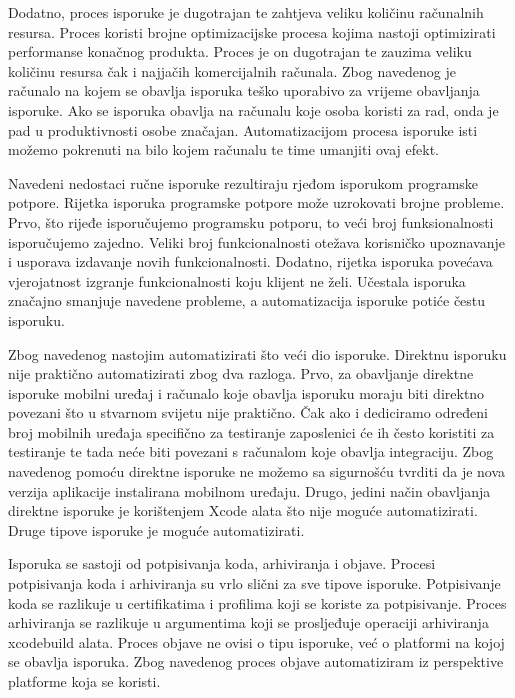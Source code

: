\documentclass[times, utf8, diplomski, numeric]{fer}
\begin{document}
Dodatno, proces isporuke je dugotrajan te zahtjeva veliku količinu računalnih resursa. Proces koristi brojne optimizacijske procesa kojima nastoji optimizirati performanse konačnog produkta. Proces je on dugotrajan te zauzima veliku količinu resursa čak i najjačih komercijalnih računala. Zbog navedenog je računalo na kojem se obavlja isporuka teško uporabivo za vrijeme obavljanja isporuke. Ako se isporuka obavlja na računalu koje osoba koristi za rad, onda je pad u produktivnosti osobe značajan. Automatizacijom procesa isporuke isti možemo pokrenuti na bilo kojem računalu te time umanjiti ovaj efekt.

Navedeni nedostaci ručne isporuke rezultiraju rjeđom isporukom programske potpore. Rijetka isporuka programske potpore može uzrokovati brojne probleme. Prvo, što rijeđe isporučujemo programsku potporu, to veći broj funksionalnosti isporučujemo zajedno. Veliki broj funkcionalnosti otežava korisničko upoznavanje i usporava izdavanje novih funkcionalnosti. Dodatno, rijetka isporuka povećava vjerojatnost izgranje funkcionalnosti koju klijent ne želi. Učestala isporuka značajno smanjuje navedene probleme, a automatizacija isporuke potiće čestu isporuku.

Zbog navedenog nastojim automatizirati što veći dio isporuke. Direktnu isporuku nije praktično automatizirati zbog dva razloga. Prvo, za obavljanje direktne isporuke mobilni uređaj i računalo koje obavlja isporuku moraju biti direktno povezani što u stvarnom svijetu nije praktično. Čak ako i dediciramo određeni broj mobilnih uređaja specifično za testiranje zaposlenici će ih često koristiti za testiranje te tada neće biti povezani s računalom koje obavlja integraciju. Zbog navedenog pomoću direktne isporuke ne možemo sa sigurnošću tvrditi da je nova verzija aplikacije instalirana mobilnom uređaju. Drugo, jedini način obavljanja direktne isporuke je korištenjem Xcode alata što nije moguće automatizirati. Druge tipove isporuke je moguće automatizirati.

Isporuka se sastoji od potpisivanja koda, arhiviranja i objave. Procesi potpisivanja koda i arhiviranja su vrlo slični za sve tipove isporuke. Potpisivanje koda se razlikuje u  certifikatima i profilima koji se koriste za potpisivanje. Proces arhiviranja se razlikuje u argumentima koji se prosljeđuje operaciji arhiviranja xcodebuild alata. Proces objave ne ovisi o tipu isporuke, već o platformi na kojoj se obavlja isporuka. Zbog navedenog proces objave automatiziram iz perspektive platforme koja se koristi.
\end{document}
